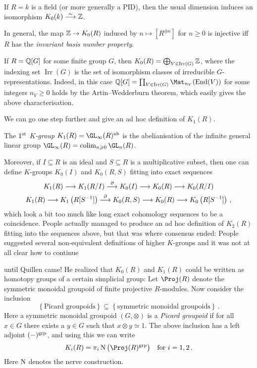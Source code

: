 	\begin{exm}
		\begin{alphanumerate}
			\item If $R=k$ is a field (or more generally a PID), then the usual dimension induces an isomorphism $K_0(k)\isomorphism\IZ$.
			\item In general, the map $\mathbb{Z}\rightarrow K_0(R)$ induced by $n\mapsto [R^{\oplus n}]$ for $n\geq0$ is injective iff $R$ has the \emph{invariant basis number property}.
			\item If $R=\mathbb{Q}[G]$ for some finite group $G$, then $K_0(R)=\bigoplus_{V\in \operatorname{Irr}(G)}\mathbb{Z}$, where the indexing set $\operatorname{Irr}(G)$ is the set of isomorphism classes of irreducible $G$-representations. Indeed, in this case $\IQ[G]=\prod_{V\in\operatorname{Irr}(G)}\Mat_{n_V}(\End(V))$ for some integers $n_V\geq 0$ holds by the Artin--Wedderburn theorem, which easily gives the above characterisation.
		\end{alphanumerate}
	\end{exm}
	We can go one step further and give an ad hoc definition of $K_1(R)$.
	\begin{defi}\label{def:K1R}
		The \emph{$1^{\text{st}}$ $K$-group} $K_1(R)=\GL_\infty(R)^\ab$ is the abelianisation of the infinite general linear group $\GL_\infty(R)=\colimit_{n\geq 0}\GL_n(R)$.
	\end{defi}
	Moreover, if $I\subseteq R$ is an ideal and $S\subseteq R$ is a multiplicative subset, then one can define $K$-groups $K_0(I)$ and $K_0(R,S)$ fitting into exact sequences
	\begin{gather*}
		K_1(R)\morphism K_1(R/I)\morphism[\partial]K_0(I)\morphism K_0(R)\morphism K_0(R/I)\\
		K_1(R)\morphism K_1\left(R[S^{-1}]\right)\morphism[\partial]K_0(R,S)\morphism K_0(R)\morphism K_0\left(R[S^{-1}]\right)\,,
	\end{gather*}
	which look a bit too much like long exact cohomology sequences to be a coincidence. People actually managed to produce an ad hoc definition of $K_2(R)$ fitting into the sequences above, but that was where consensus ended: People suggested several non-equivalent definitions of higher $K$-groups and it was not at all clear how to continue \dotso 
	
	\dotso until Quillen came! He realized that $K_0(R)$ and $K_1(R)$ could be written as homotopy groups of a certain simplicial group: Let $\Proj (R)$ denote the symmetric monoidal groupoid of finite projective $R$-modules. Now consider the inclusion
	\begin{equation*}
		\left\{\text{Picard groupoids}\right\}\subseteq \left\{\text{symmetric monoidal groupoids}\right\}\,.
	\end{equation*}
	Here a symmetric monoidal groupoid $(G,\otimes)$ is a \emph{Picard groupoid} if for all $x\in G$ there exists a $y\in G$ such that $x\otimes y\simeq 1$. The above inclusion has a left adjoint $(-)^{\mathrm{grp}}$, and using this we can write
	\begin{equation*}
		K_i(R)=\pi_i\N\big(\Proj (R)^\grp\big)\quad\text{for }i=1,2\,.
	\end{equation*}
	Here $\operatorname{N}$ denotes the nerve construction.

